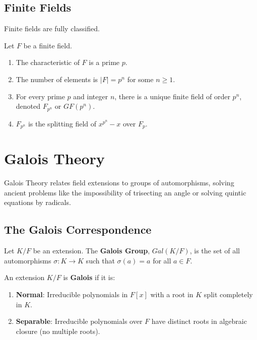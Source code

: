 \newpage

\subsection{Finite Fields}

Finite fields are fully classified.
\begin{theorem}
Let $F$ be a finite field.
\begin{enumerate}
    \item The characteristic of $F$ is a prime $p$.
    \item The number of elements is $|F| = p^n$ for some $n \geq 1$.
    \item For every prime $p$ and integer $n$, there is a unique finite field of order $p^n$, denoted $F_{p^n}$ or $GF(p^n)$.
    \item $F_{p^n}$ is the splitting field of $x^{p^n} - x$ over $F_p$.
\end{enumerate}
\end{theorem}

\section{Galois Theory}

Galois Theory relates field extensions to groups of automorphisms, solving ancient problems like the impossibility of trisecting an angle or solving quintic equations by radicals.

\subsection{The Galois Correspondence}

\begin{definition}
Let $K/F$ be an extension. The \textbf{Galois Group}, $Gal(K/F)$, is the set of all automorphisms $\sigma: K \to K$ such that $\sigma(a) = a$ for all $a \in F$.
\end{definition}

\begin{definition}
An extension $K/F$ is \textbf{Galois} if it is:
\begin{enumerate}
    \item \textbf{Normal}: Irreducible polynomials in $F[x]$ with a root in $K$ split completely in $K$.
    \item \textbf{Separable}: Irreducible polynomials over $F$ have distinct roots in algebraic closure (no multiple roots).
\end{enumerate}
\end{definition}

